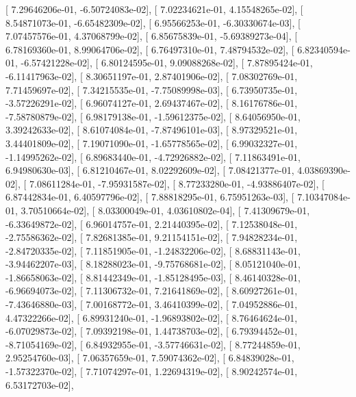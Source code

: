 \documentclass{article}
\begin{document}
       [  7.29646206e-01,  -6.50724083e-02],
       [  7.02234621e-01,   4.15548265e-02],
       [  8.54871073e-01,  -6.65482309e-02],
       [  6.95566253e-01,  -6.30330674e-03],
       [  7.07457576e-01,   4.37068799e-02],
       [  6.85675839e-01,  -5.69389273e-04],
       [  6.78169360e-01,   8.99064706e-02],
       [  6.76497310e-01,   7.48794532e-02],
       [  6.82340594e-01,  -6.57421228e-02],
       [  6.80124595e-01,   9.09088268e-02],
       [  7.87895424e-01,  -6.11417963e-02],
       [  8.30651197e-01,   2.87401906e-02],
       [  7.08302769e-01,   7.71459697e-02],
       [  7.34215535e-01,  -7.75089998e-03],
       [  6.73950735e-01,  -3.57226291e-02],
       [  6.96074127e-01,   2.69437467e-02],
       [  8.16176786e-01,  -7.58780879e-02],
       [  6.98179138e-01,  -1.59612375e-02],
       [  8.64056950e-01,   3.39242633e-02],
       [  8.61074084e-01,  -7.87496101e-03],
       [  8.97329521e-01,   3.44401809e-02],
       [  7.19071090e-01,  -1.65778565e-02],
       [  6.99032327e-01,  -1.14995262e-02],
       [  6.89683440e-01,  -4.72926882e-02],
       [  7.11863491e-01,   6.94980630e-03],
       [  6.81210467e-01,   8.02292609e-02],
       [  7.08421377e-01,   4.03869390e-02],
       [  7.08611284e-01,  -7.95931587e-02],
       [  8.77233280e-01,  -4.93886407e-02],
       [  6.87442834e-01,   6.40597796e-02],
       [  7.88818295e-01,   6.75951263e-03],
       [  7.10347084e-01,   3.70510664e-02],
       [  8.03300049e-01,   4.03610802e-04],
       [  7.41309679e-01,  -6.33649872e-02],
       [  6.96014757e-01,   2.21440395e-02],
       [  7.12538048e-01,  -2.75586362e-02],
       [  7.82681385e-01,   9.21154151e-02],
       [  7.94828234e-01,  -2.84720335e-02],
       [  7.11851905e-01,  -1.24832206e-02],
       [  8.68831143e-01,  -3.94462207e-03],
       [  8.18288023e-01,  -9.75768681e-02],
       [  8.05121040e-01,  -1.86658063e-02],
       [  8.81442349e-01,  -1.85128495e-03],
       [  8.46140328e-01,  -6.96694073e-02],
       [  7.11306732e-01,   7.21641869e-02],
       [  8.60927261e-01,  -7.43646880e-03],
       [  7.00168772e-01,   3.46410399e-02],
       [  7.04952886e-01,   4.47322266e-02],
       [  6.89931240e-01,  -1.96893802e-02],
       [  8.76464624e-01,  -6.07029873e-02],
       [  7.09392198e-01,   1.44738703e-02],
       [  6.79394452e-01,  -8.71054169e-02],
       [  6.84932955e-01,  -3.57746631e-02],
       [  8.77244859e-01,   2.95254760e-03],
       [  7.06357659e-01,   7.59074362e-02],
       [  6.84839028e-01,  -1.57322370e-02],
       [  7.71074297e-01,   1.22694319e-02],
       [  8.90242574e-01,   6.53172703e-02],
\end{document}
